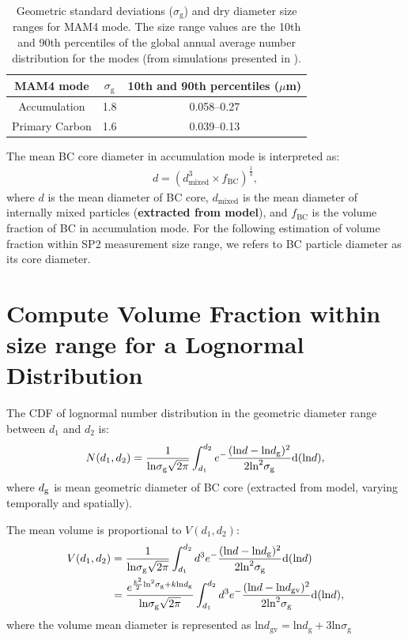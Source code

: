 \documentclass[11pt]{article}
\begin{document}
	\begin{table}
		\begin{center}
			\begin{tabular}{c c c}
				\hline  
				MAM4 mode & $\sigma_{\text{g}}$ &  10th and 90th percentiles ($\mu$m)		\\   \hline
				Accumulation  & 1.8  &   0.058--0.27 		\\ \hline
				Primary Carbon   & 1.6  &  0.039--0.13  		\\
				\hline			
			\end{tabular}
		\end{center}
		\caption{\label{tab:ozone} Geometric standard deviations ($\sigma_{\text{g}}$) and dry diameter size ranges for MAM4 mode. The size range values are the 10th and 90th percentiles of the global annual average number distribution for the modes (from simulations presented in \citet{Liu2012}).\label{tab:mam4_modes}}
	\end{table}
	
	
	The mean BC core diameter in accumulation mode is interpreted as:
	\begin{align*}
	d = (d_{\text{mixed}}^3 \times f_{\text{BC}})^\frac{1}{3}, 
	\end{align*}
	where $d$ is the mean diameter of BC core,
	$d_{\text{mixed}}$ is the mean diameter of internally mixed particles
	(\textbf{extracted from model}), and $f_{\text{BC}}$ is the volume
	fraction of BC in accumulation mode. For the following estimation of volume fraction within SP2 measurement size range, we refers to BC particle diameter as its core diameter.
	
	\section{Compute Volume Fraction within size range for a Lognormal Distribution}
	The CDF of lognormal number distribution in the geometric diameter range between $d_{1}$ and
	$d_{2}$ is:
	\begin{align*}
	N(d_{1}, d_{2}) = \frac{1}{\text{ln}\sigma_{\text{g}}\sqrt{2\pi}}\int_{d_{1}}^{d_{2}}e^-\frac{(\text{ln}d - \text{ln}d_{\rm g})^2}{2\text{ln}^2\sigma_{\text{g}}}\text{d}(\text{ln}d),
	\end{align*}
	where $d_{\rm g}$ is mean geometric diameter of BC core (extracted from model, varying temporally and spatially). 
	
	The mean volume is proportional to $V(d_{1}, d_{2})$:
	\begin{align*}
	V(d_{1}, d_{2}) &= \frac{1}{\text{ln}\sigma_{\text{g}}\sqrt{2\pi}}\int_{d_{1}}^{d_{2}}d^3e^-\frac{(\text{ln}d - \text{ln}d_{\rm g})^2}{2\text{ln}^2\sigma_{\text{g}}}\text{d}(\text{ln}d)  \\
	&=\frac{e^{\frac{k^2}{2}\text{ln}^2\sigma_{\rm g}+k\text{ln}d_{\rm g}}}{\text{ln}\sigma_{\text{g}}\sqrt{2\pi}}\int_{d_{1}}^{d_{2}}d^3e^-\frac{(\text{ln}d - \text{ln}d_{\text{gv}})^2}{2\text{ln}^2\sigma_{\text{g}}}\text{d}(\text{ln}d),
	\end{align*}
	where the volume mean diameter is represented as $\text{ln}d_{\text{gv}}
	= \text{ln}d_{\text{g}} + 3\text{ln}\sigma_{\text{g}}$
	
\end{document}
